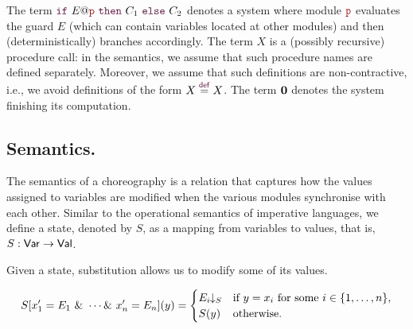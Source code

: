 The term $\ifTE {E}{\nr}{C_1}{C_2}$ denotes a system where module
  $\role p$ evaluates the guard $E$ (which can contain variables
  located at other modules) and then (deterministically) branches
  accordingly.  The term $X$ is a (possibly recursive) procedure call:
  in the semantics, we assume that such procedure names are defined
  separately. Moreover, we assume that such definitions are
  non-contractive, i.e., we avoid definitions of the form
  $X\stackrel{\textcolor{sh_keyword}{\mathsf{def}}}{=}X$. The term
  $\mathbf{0}$ denotes the system finishing its computation.

  \begin{assumption}\label{ass:0}
  \end{assumption}
  
\subsection{Semantics.}
The semantics of a choreography is a relation that captures how the
values assigned to variables are modified when the various modules
synchronise with each other. Similar to the operational semantics of
imperative languages, we define a state, denoted by $S$, as a mapping
from variables to values, that is, $S : \mathsf{Var} \rightarrow \mathsf{Val}$.

Given a state, substitution allows us to modify some of its values.

%
\begin{definition}
  \[
    S[x_1' = E_1\ \&\ \cdots \&\ x_n' = E_n](y) =
    \begin{cases}
      \eval{E_i}{S} & \text{if } y = x_i \text{ for some } i \in \{1, \ldots, n\},\\
      S(y)          & \text{otherwise.}
    \end{cases}
  \]
\end{definition}

